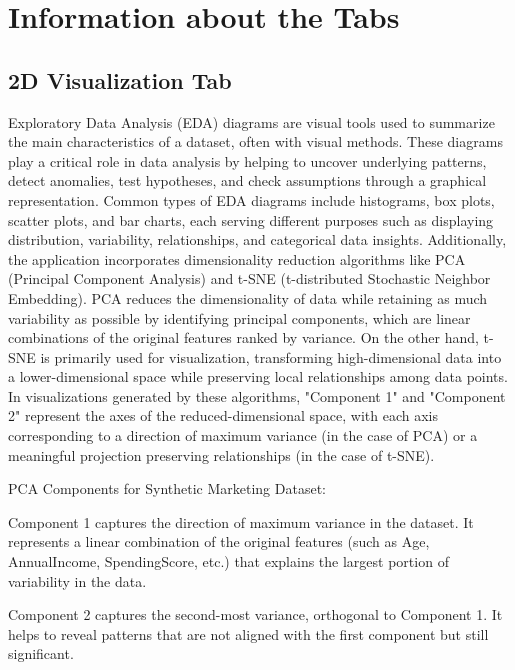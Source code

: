 \documentclass[unnumsec,webpdf,contemporary,large]{oup-authoring-template}%
\theoremstyle{thmstyleone}%
\theoremstyle{thmstyletwo}%
\theoremstyle{thmstylethree}%
\begin{document}
\section{Information about the Tabs}\label{subsec1}
\vspace{0.3cm}

\subsection{\textbf{2D Visualization Tab}}
\vspace{0.2cm}

Exploratory Data Analysis (EDA) diagrams are visual tools used to summarize the main characteristics of a dataset, often with visual methods. These diagrams play a critical role in data analysis by helping to uncover underlying patterns, detect anomalies, test hypotheses, and check assumptions through a graphical representation. Common types of EDA diagrams include histograms, box plots, scatter plots, and bar charts, each serving different purposes such as displaying distribution, variability, relationships, and categorical data insights. Additionally, the application incorporates dimensionality reduction algorithms like PCA (Principal Component Analysis) and t-SNE (t-distributed Stochastic Neighbor Embedding). PCA reduces the dimensionality of data while retaining as much variability as possible by identifying principal components, which are linear combinations of the original features ranked by variance. On the other hand, t-SNE is primarily used for visualization, transforming high-dimensional data into a lower-dimensional space while preserving local relationships among data points. In visualizations generated by these algorithms, "Component 1" and "Component 2" represent the axes of the reduced-dimensional space, with each axis corresponding to a direction of maximum variance (in the case of PCA) or a meaningful projection preserving relationships (in the case of t-SNE).
\vspace{0.2cm}

PCA Components for Synthetic Marketing Dataset:
\vspace{0.2cm}

Component 1 captures the direction of maximum variance in the dataset. It represents a linear combination of the original features (such as Age, AnnualIncome, SpendingScore, etc.) that explains the largest portion of variability in the data.
\vspace{0.2cm}

Component 2 captures the second-most variance, orthogonal to Component 1. It helps to reveal patterns that are not aligned with the first component but still significant.
\vspace{0.2cm}
\end{document}
